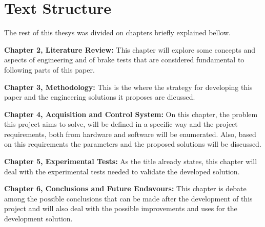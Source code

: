 	\section{Text Structure}\label{sec:text-structure}
	
	The rest of this thesys was divided on chapters briefly explained bellow.
	
	\textbf{Chapter 2, Literature Review: } This chapter will explore some concepts and aspects of engineering and of brake tests that are considered fundamental to following parts of this paper.
	\par
	
	\textbf{Chapter 3, Methodology: }
	This is the where the strategy for developing this paper and the engineering solutions it proposes are dicussed.
	\par
	
	\textbf{Chapter 4, Acquisition and Control System: }
	On this chapter, the problem this project aims to solve, will be defined in a specific way and the project requirements, both from hardware and software will be enumerated. Also, based on this requirements the parameters and the proposed solutions will be discussed.
	\par
	
	\textbf{Chapter 5, Experimental Tests: }
	As the title already states, this chapter will deal with the experimental tests needed to validate the developed solution.
	\par
	
	\textbf{Chapter 6, Conclusions and Future Endavours: }
	This chapter is debate among the possible conclusions that can be made after the development of this project and will also deal with the possible improvements and uses for the development solution.